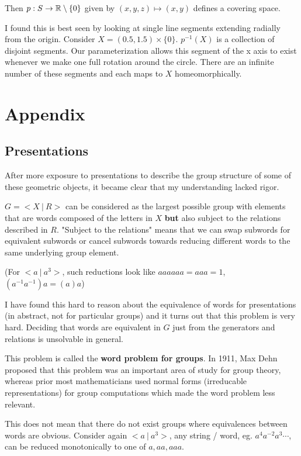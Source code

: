 \documentclass[10pt]{article}
\begin{document}
Then $p: S \to \mathbb{R} \setminus \{0\}$ given by $(x, y, z) \mapsto (x, y)$ defines a
covering space.

I found this is best seen by looking at single line segments extending radially
from the origin. Consider $X = (0.5, 1.5) \times \{0\}$. $p^{-1}(X)$ is a
collection of disjoint segments. Our parameterization allows this segment of
the x axis to exist whenever we make one full rotation around the circle. There
are an infinite number of these segments and each maps to $X$ homeomorphically.

\section{Appendix}

\subsection{Presentations}

After more exposure to presentations to describe the group structure of some of
these geometric objects, it became clear that my understanding lacked rigor.

$G = <X~|~R>$ can be considered as the largest possible group with elements
that are words composed of the letters in $X$ \textbf{but} also subject to the
relations described in $R$. "Subject to the relations" means that we can swap
subwords for equivalent subwords or cancel subwords towards reducing different
words to the same underlying group element. 

(For $<a ~|~a^3>$, such reductions look like $aaaaaa = aaa = 1$, $(a^{-1}a^{-1})a = (a)a$)

I have found this hard to reason about the equivalence of words for
presentations (in abstract, not for particular groups) and it turns out that
this problem is very hard. Deciding that words are equivalent in $G$ just from
the generators and relations is unsolvable in general.

\begin{note}
	This problem is called the \textbf{word problem for groups}. In 1911, Max
	Dehn proposed that this problem was an important area of study for group
	theory, whereas prior most mathematicians used normal forms (irreducable
	representations) for group computations which made the word problem less
	relevant.
\end{note}

This does not mean that there do not exist groups where equivalences between
words are obvious. Consider again $<a ~|~a^3>$, any string / word, eg.
$a^4a^{-2}a^3\cdots$, can be reduced monotonically to one of $a, aa, aaa$. 
\end{document}
